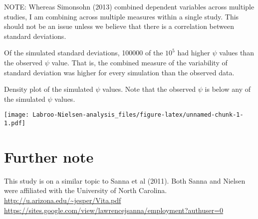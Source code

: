 \documentclass[]{article}
\newenvironment{Shaded}{\begin{snugshade}}{\end{snugshade}}
\newcommand{\CommentTok}[1]{\textcolor[rgb]{0.56,0.35,0.01}{\textit{#1}}}
\newcommand{\DataTypeTok}[1]{\textcolor[rgb]{0.13,0.29,0.53}{#1}}
\newcommand{\DecValTok}[1]{\textcolor[rgb]{0.00,0.00,0.81}{#1}}
\newcommand{\KeywordTok}[1]{\textcolor[rgb]{0.13,0.29,0.53}{\textbf{#1}}}
\newcommand{\NormalTok}[1]{#1}
\newcommand{\OperatorTok}[1]{\textcolor[rgb]{0.81,0.36,0.00}{\textbf{#1}}}
\newcommand{\OtherTok}[1]{\textcolor[rgb]{0.56,0.35,0.01}{#1}}
\newcommand{\StringTok}[1]{\textcolor[rgb]{0.31,0.60,0.02}{#1}}
\begin{document}
NOTE: Whereas Simonsohn (2013) combined dependent variables across
multiple studies, I am combining across multiple measures within a
single study. This should not be an issue unless we believe that there
is a correlation between standard deviations.

\begin{Shaded}
\end{Shaded}

Of the simulated standard deviations, 100000 of the \ensuremath{10^{5}}
had higher \(\psi\) values than the observed \(\psi\) value. That is,
the combined measure of the variability of standard deviation was higher
for every simulation than the observed data.

Density plot of the simulated \(\psi\) values. Note that the observed
\(\psi\) is below any of the simulated \(\psi\) values.

\begin{Shaded}
\end{Shaded}

\texttt{[image: Labroo-Nielsen-analysis\_files/figure-latex/unnamed-chunk-1-1.pdf]}

\hypertarget{further-note}{%
\section{Further note}\label{further-note}}

This study is on a similar topic to Sanna et al (2011). Both Sanna and
Nielsen were affiliated with the University of North Carolina.
\url{http://u.arizona.edu/~jesper/Vita.pdf}
\url{https://sites.google.com/view/lawrencejsanna/employment?authuser=0}
\end{document}

